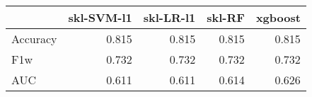 \begin{tabular}{lrrrr}
\toprule
{} &  skl-SVM-l1 &  skl-LR-l1 &  skl-RF &  xgboost \\
\midrule
Accuracy &       0.815 &      0.815 &   0.815 &    0.815 \\
F1w      &       0.732 &      0.732 &   0.732 &    0.732 \\
AUC      &       0.611 &      0.611 &   0.614 &    0.626 \\
\bottomrule
\end{tabular}
